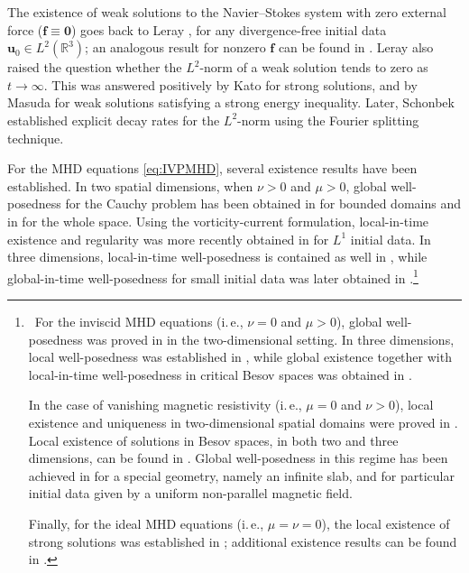 \documentclass[10pt]{amsart}
\theoremstyle{plain}
\theoremstyle{definition}
\theoremstyle{remark}
\numberwithin{equation}{section}
\newcommand{\bu}{{\boldsymbol{u}}}
\newcommand{\Bf}{{\boldsymbol{f}}}
\begin{document}
The existence of weak solutions to the Navier--Stokes system with zero external force ($\Bf\equiv \mathbf0$) goes back to Leray \cite{Leray1934}, for any divergence-free initial data $\bu_0\in L^2(\mathbb{R}^3)$; an analogous result for nonzero $\Bf$ can be found in  \cite[Chapter III]{Temam1979}. Leray also raised the question whether the $L^2$-norm of a weak solution tends to zero as $t\to\infty$. This was answered positively by Kato \cite{Kato1984} for strong solutions, and by Masuda \cite{Masuda1984} for weak solutions satisfying a strong energy inequality. Later, Schonbek \cite{Schonbek1985, Schonbek1986} established explicit decay rates for the $L^2$-norm using the Fourier splitting technique. 

For the MHD equations \cref{eq:IVPMHD}, several existence results have been established. In two spatial dimensions, when $\nu > 0$ and $\mu > 0$, global well-posedness for the Cauchy
problem has been obtained in  \cite{MR716200,MR346289} for bounded domains and in \cite{MR1616418} for the whole space. Using the  vorticity-current formulation, local-in-time existence and regularity was more recently obtained in \cite{zbMATH08005764} for $L^1$ initial data. In three dimensions, local-in-time well-posedness is contained as well in \cite{MR716200,MR346289,MR1616418} , while global-in-time well-posedness
for small initial data was later obtained in \cite{MR3780143}.\footnote{~For the inviscid MHD equations (i.\,e., $\nu = 0$ and $\mu > 0$), global well-posedness was
proved in \cite{MR1007099} in the two-dimensional setting. In three dimensions, local
well-posedness was established in \cite{MR2507450}, while global existence together with
local-in-time well-posedness in critical Besov spaces was obtained in \cite{MR4496608}.

In the case of vanishing magnetic resistivity (i.\,e., $\mu = 0$ and $\nu > 0$), local
existence and uniqueness in two-dimensional spatial domains were proved in
\cite{MR2265204,MR3217057,MR2772455}. Local existence of solutions in Besov spaces, in both
two and three dimensions, can be found in \cite{MR3415680,MR3590662}. Global well-posedness
in this regime has been achieved in \cite{MR3766969} for a special geometry, namely an
infinite slab, and for particular initial data given by a uniform non-parallel magnetic
field.

Finally, for the ideal MHD equations (i.\,e., $\mu = \nu = 0$), the local existence of strong
solutions was established in \cite{MR952901,MR1257135}; additional existence results can be found in \cite{zbMATH07327027,zbMATH05675031,zbMATH07635066,zbMATH08053923,zbMATH06383463}.}
\end{document}
